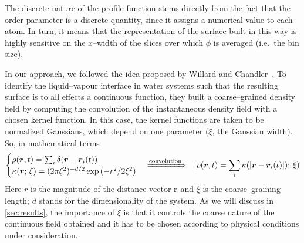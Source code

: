 The discrete nature of the profile function stems directly from the fact that the order parameter is a discrete quantity, since it assigns a numerical value to each atom. In turn, it means that the representation of the surface built in this way is highly sensitive on the $x$--width of the slices over which $\phi$ is averaged (i.e.\ the bin size). %

In our approach, we followed the idea proposed by Willard and Chandler~\cite{WilChaJCP2010}. To identify the liquid--vapour interface in water systems such that the resulting surface is to all effects a continuous function, they built a coarse--grained density field by computing the convolution of the instantaneous density field with a chosen kernel function. In this case, the kernel functions are taken to be normalized Gaussians, which depend on one parameter ($\xi$, the Gaussian width). So, in mathematical terms
\begin{equation}
\label{eqn:density-field}
    \begin{cases}
        \rho(\bm{r},t)=\sum_i \delta(\bm{r}-\bm{r}_i(t)) \\
        \kappa(\bm{r};\,\xi)= (2\pi\xi^2)^{-d/2} \exp{(-r^2/2\xi^2)}
    \end{cases}
    \xRightarrow{\text{convolution}}\quad
    \overline{\rho}(\bm{r},t)=\sum_i \kappa( |\bm{r}-\bm{r}_i(t)| );\,\xi)
\end{equation}
Here $r$ is the magnitude of the distance vector $\bm{r}$ and $\xi$ is the coarse--graining length; $d$ stands for the dimensionality of the system. As we will discuss in \cref{sec:results}, the importance of $\xi$ is that it controls the coarse nature of the continuous field obtained and it has to be chosen according to physical conditions under consideration.

